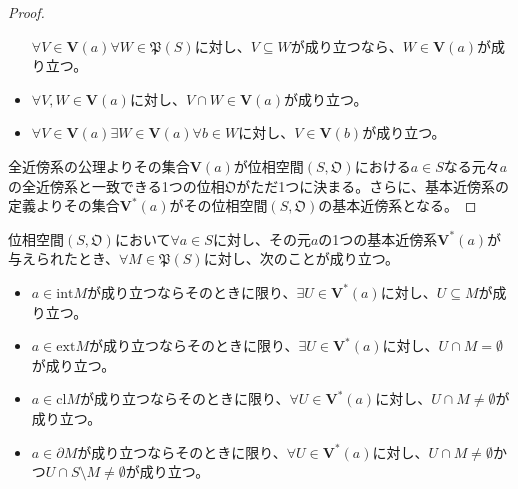 \documentclass[dvipdfmx]{jsarticle}
\begin{document}
\begin{proof}
\begin{itemize}
  $\forall V \in \mathbf{V}(a)\forall W \in \mathfrak{P}(S)$に対し、$V \subseteq W$が成り立つなら、$W \in \mathbf{V}(a)$が成り立つ。
\item
  $\forall V,W \in \mathbf{V}(a)$に対し、$V \cap W \in \mathbf{V}(a)$が成り立つ。
\item
  $\forall V \in \mathbf{V}(a)\exists W \in \mathbf{V}(a)\forall b \in W$に対し、$V \in \mathbf{V}(b)$が成り立つ。
\end{itemize}
全近傍系の公理よりその集合$\mathbf{V}(a)$が位相空間$\left( S,\mathfrak{O} \right)$における$a \in S$なる元々$a$の全近傍系と一致できる1つの位相$\mathfrak{O}$がただ1つに決まる。さらに、基本近傍系の定義よりその集合$\mathbf{V}^{*}(a)$がその位相空間$\left( S,\mathfrak{O} \right)$の基本近傍系となる。
\end{proof}
\begin{thm}\label{8.1.2.15}
位相空間$\left( S,\mathfrak{O} \right)$において$\forall a \in S$に対し、その元$a$の1つの基本近傍系$\mathbf{V}^{*}(a)$が与えられたとき、$\forall M \in \mathfrak{P}(S)$に対し、次のことが成り立つ。
\begin{itemize}
\item
  $a \in {\mathrm{int}}M$が成り立つならそのときに限り、$\exists U \in \mathbf{V}^{*}(a)$に対し、$U \subseteq M$が成り立つ。
\item
  $a \in {\mathrm{ext}}M$が成り立つならそのときに限り、$\exists U \in \mathbf{V}^{*}(a)$に対し、$U \cap M = \emptyset$が成り立つ。
\item
  $a \in {\mathrm{cl}}M$が成り立つならそのときに限り、$\forall U \in \mathbf{V}^{*}(a)$に対し、$U \cap M \neq \emptyset$が成り立つ。
\item
  $a \in \partial M$が成り立つならそのときに限り、$\forall U \in \mathbf{V}^{*}(a)$に対し、$U \cap M \neq \emptyset$かつ$U \cap S \setminus M \neq \emptyset$が成り立つ。
\end{itemize}
\end{thm}
\end{document}
